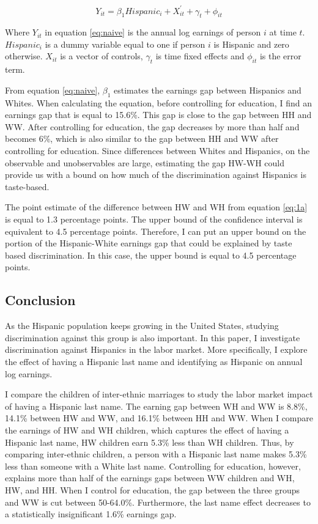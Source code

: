 \documentclass[12pt, fullpage]{article}
\begin{document}
 \begin{equation} \label{eq:naive}
 Y_{it} = \beta_{1} Hispanic_{i} + X_{it}^{\prime} + \gamma_{t}+\phi_{it}
 \end{equation}
 
 Where $Y_{it}$ in equation \ref{eq:naive} is the annual log earnings of person $i$ at time $t$. $Hispanic_{i}$ is a dummy variable equal to one if person $i$ is Hispanic and zero otherwise. $X_{it}$ is a vector of controls, $\gamma_{t}$ is time fixed effects and $\phi_{it}$ is the error term.
 
 From equation \ref{eq:naive}, $\beta_{1}$ estimates the earnings gap between Hispanics and Whites. When calculating the equation, before controlling for education, I find an earnings gap that is equal to 15.6\%. This gap is close to the gap between HH and WW. After controlling for education, the gap decreases by more than half and becomes 6\%, which is also similar to the gap between HH and WW after controlling for education. Since differences between Whites and Hispanics, on the observable and unobservables are large, estimating the gap HW-WH could provide us with a bound on how much of the discrimination against Hispanics is taste-based. 
 
The point estimate of the difference between HW and WH from equation \ref{eq:1a} is equal to 1.3 percentage points. The upper bound of the confidence interval is equivalent to 4.5 percentage points. Therefore, I can put an upper bound on the portion of the Hispanic-White earnings gap that could be explained by taste based discrimination. In this case, the upper bound is equal to 4.5 percentage points.

\subsection{Conclusion}\label{sec:con}

As the Hispanic population keeps growing in the United States, studying discrimination against this group is also important. In this paper, I investigate discrimination against Hispanics in the labor market. More specifically, I explore the effect of having a Hispanic last name and identifying as Hispanic on annual log earnings. 

I compare the children of inter-ethnic marriages to study the labor market impact of having a Hispanic last name. The earning gap between WH and WW is 8.8\%, 14.1\% between HW and WW, and 16.1\% between HH and WW. When I compare the earnings of HW and WH children, which captures the effect of having a Hispanic last name, HW children earn 5.3\% less than WH children. Thus, by comparing inter-ethnic children, a person with a Hispanic last name makes 5.3\% less than someone with a White last name. Controlling for education, however, explains more than half of the earnings gaps between WW children and WH, HW, and HH. When I control for education, the gap between the three groups and WW is cut between 50-64.0\%. Furthermore, the last name effect decreases to a statistically insignificant 1.6\% earnings gap.
\end{document}
